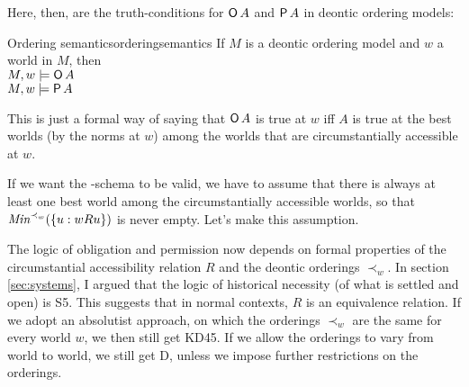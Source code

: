 Here, then, are the truth-conditions for $\operatorname{\mathsf{O}} A$ and $\operatorname{\mathsf{P}} A$ in deontic ordering
models:


\begin{definition}{Ordering semantics}{orderingsemantics}
  If $M$ is a deontic ordering model and $w$ a world in $M$, then\\[1mm]
  $M,w \models \Ob A$ \\
  $M,w \models \Pe A$ 
\end{definition}
\noindent%
This is just a formal way of saying that $\operatorname{\mathsf{O}} A$ is true at $w$ iff $A$ is true
at the best worlds (by the norms at $w$) among the worlds that are circumstantially accessible at $w$.

If we want the -schema to be valid, we have to assume that there is always
at least one best world among the circumstantially accessible worlds, so that
$\emph{Min}^{\prec_w}(\{ u: wRu\})$ is never empty. Let's make this assumption.

The logic of obligation and permission now depends on formal properties of the
circumstantial accessibility relation $R$ and the deontic orderings $\prec_w$.
In section \ref{sec:systems}, I argued that the logic of historical necessity
(of what is settled and open) is S5. This suggests that in normal contexts, $R$
is an equivalence relation. If we adopt an absolutist approach, on which the
orderings $\prec_{w}$ are the same for every world $w$, we then still get KD45.
If we allow the orderings to vary from world to world, we still get D, unless we
impose further restrictions on the orderings.


